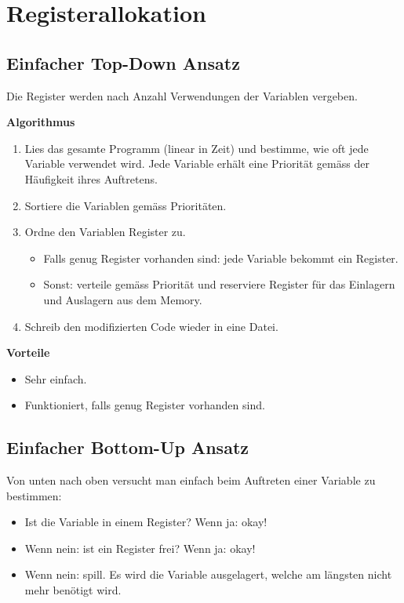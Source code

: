 \section{Registerallokation}


\subsection{Einfacher Top-Down Ansatz}

Die Register werden nach Anzahl Verwendungen der Variablen vergeben.

\textbf{Algorithmus}

\begin{enumerate}
	\item Lies das gesamte Programm (linear in Zeit) und bestimme, wie oft jede
		Variable verwendet wird. Jede Variable erhält eine Priorität gemäss der
		Häufigkeit ihres Auftretens.
	\item Sortiere die Variablen gemäss Prioritäten.
	\item Ordne den Variablen Register zu.
		\begin{itemize}
			\item Falls genug Register vorhanden sind: jede Variable bekommt ein
				Register.
			\item Sonst: verteile gemäss Priorität und reserviere Register für das
				Einlagern und Auslagern aus dem Memory.
		\end{itemize}
	\item Schreib den modifizierten Code wieder in eine Datei.
\end{enumerate}

\textbf{Vorteile}

\begin{itemize}
	\item Sehr einfach.
	\item Funktioniert, falls genug Register vorhanden sind.
\end{itemize}


\subsection{Einfacher Bottom-Up Ansatz}

Von unten nach oben versucht man einfach beim Auftreten einer Variable zu
bestimmen:

\begin{itemize}
	\item Ist die Variable in einem Register? Wenn ja: okay!
	\item Wenn nein: ist ein Register frei? Wenn ja: okay!
	\item Wenn nein: spill. Es wird die Variable ausgelagert, welche am längsten
		nicht mehr benötigt wird.
\end{itemize}


